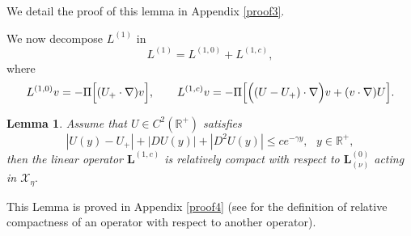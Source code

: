 \documentclass[11pt]{article}
\newtheorem{lemma}[theorem]{Lemma}
\begin{document}
We detail the proof of this lemma in Appendix \ref{proof3}.

We now decompose $L^{(1)}$ in
$$
L^{(1)} = L^{(1,0)} + L^{(1,c)},
$$
where
$$
L^{(1,0)} v  = - \Pi \Bigl[ (U_+ \cdot \nabla) v \Bigr],
\qquad 
L^{(1,c)} v = - \Pi \Bigl[ \Bigl( (U - U_+) \cdot \nabla \Bigr) v  + (v \cdot \nabla) U \Bigr].
$$
\begin{lemma}
\label{relatcomp} Assume that $U\in C^{2}(\mathbb{R}^{+})$ satisfies%
\begin{equation*}
|U(y) - U_+|+|DU(y)|+|D^{2}U(y)|\leq ce^{-\gamma y},\text{ }y\in \mathbb{R}^{+},
\end{equation*}%
then the linear operator $\boldsymbol{L}^{(1,c)}$ is relatively compact with
respect to $\boldsymbol{L}_{(\nu )}^{(0)}$ acting in $\mathcal{X}_{\eta}.$
\end{lemma}

This Lemma is proved in Appendix \ref{proof4} (see \cite{Kato} for the
definition of relative compactness of an operator with respect to another
operator).
\end{document}
